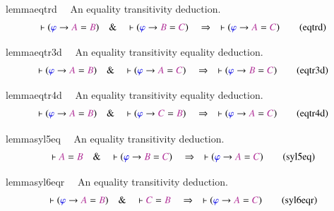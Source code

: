\begin{restatable}{lemma}{eqtrd}~~ An equality transitivity deduction. 
~
\begin{align}
\vdash ( \mw{\varphi} \rightarrow \mc{A} = \mc{B} )\quad\&\quad \vdash (
    \mw{\varphi} \rightarrow \mc{B} = \mc{C} )\quad\Rightarrow\quad \vdash (
    \mw{\varphi} \rightarrow \mc{A} = \mc{C} )\label{eq:eqtrd}\tag{eqtrd}
\end{align}
\end{restatable}

\begin{restatable}{lemma}{eqtr3d}~~ An equality transitivity equality deduction.
~
\begin{align}
\vdash ( \mw{\varphi} \rightarrow \mc{A} = \mc{B} )\quad\&\quad \vdash (
    \mw{\varphi} \rightarrow \mc{A} = \mc{C} )\quad\Rightarrow\quad \vdash (
    \mw{\varphi} \rightarrow \mc{B} = \mc{C} )\label{eq:eqtr3d}\tag{eqtr3d}
\end{align}
\end{restatable}

\begin{restatable}{lemma}{eqtr4d}~~ An equality transitivity equality deduction.
~
\begin{align}
\vdash ( \mw{\varphi} \rightarrow \mc{A} = \mc{B} )\quad\&\quad \vdash (
    \mw{\varphi} \rightarrow \mc{C} = \mc{B} )\quad\Rightarrow\quad \vdash (
    \mw{\varphi} \rightarrow \mc{A} = \mc{C} )\label{eq:eqtr4d}\tag{eqtr4d}
\end{align}
\end{restatable}

\begin{restatable}{lemma}{syl5eq}~~ An equality transitivity deduction. 
~
\begin{align}
\vdash \mc{A} = \mc{B}\quad\&\quad \vdash ( \mw{\varphi} \rightarrow \mc{B} =
    \mc{C} )\quad\Rightarrow\quad \vdash ( \mw{\varphi} \rightarrow \mc{A} =
    \mc{C} )\label{eq:syl5eq}\tag{syl5eq}
\end{align}
\end{restatable}

\begin{restatable}{lemma}{syl6eqr}~~ An equality transitivity deduction. 
~
\begin{align}
\vdash ( \mw{\varphi} \rightarrow \mc{A} = \mc{B} )\quad\&\quad \vdash \mc{C} =
    \mc{B}\quad\Rightarrow\quad \vdash ( \mw{\varphi} \rightarrow \mc{A} =
    \mc{C} )\label{eq:syl6eqr}\tag{syl6eqr}
\end{align}
\end{restatable}

